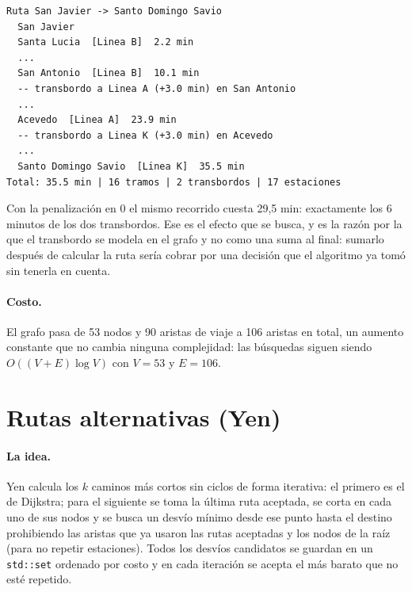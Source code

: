 \documentclass[11pt,a4paper]{article}
\newcommand{\arch}[1]{\texttt{#1}}
\begin{document}
\begin{lstlisting}[style=term]
Ruta San Javier -> Santo Domingo Savio
  San Javier
  Santa Lucia  [Linea B]  2.2 min
  ...
  San Antonio  [Linea B]  10.1 min
  -- transbordo a Linea A (+3.0 min) en San Antonio
  ...
  Acevedo  [Linea A]  23.9 min
  -- transbordo a Linea K (+3.0 min) en Acevedo
  ...
  Santo Domingo Savio  [Linea K]  35.5 min
Total: 35.5 min | 16 tramos | 2 transbordos | 17 estaciones
\end{lstlisting}

Con la penalización en 0 el mismo recorrido cuesta 29,5 min: exactamente los
6 minutos de los dos transbordos. Ese es el efecto que se busca, y es la razón por
la que el transbordo se modela en el grafo y no como una suma al final: sumarlo
después de calcular la ruta sería cobrar por una decisión que el algoritmo ya
tomó sin tenerla en cuenta.

\paragraph{Costo.}
El grafo pasa de 53 nodos y 90 aristas de viaje a 106 aristas en total, un
aumento constante que no cambia ninguna complejidad: las búsquedas siguen siendo
$O((V+E)\log V)$ con $V = 53$ y $E = 106$.

\section{Rutas alternativas (Yen)}

\paragraph{La idea.}
Yen calcula los $k$ caminos más cortos sin ciclos de forma iterativa: el primero
es el de Dijkstra; para el siguiente se toma la última ruta aceptada, se corta en
cada uno de sus nodos y se busca un desvío mínimo desde ese punto hasta el destino
prohibiendo las aristas que ya usaron las rutas aceptadas y los nodos de la raíz
(para no repetir estaciones). Todos los desvíos candidatos se guardan en un
\arch{std::set} ordenado por costo y en cada iteración se acepta el más barato que
no esté repetido.


\end{document}
